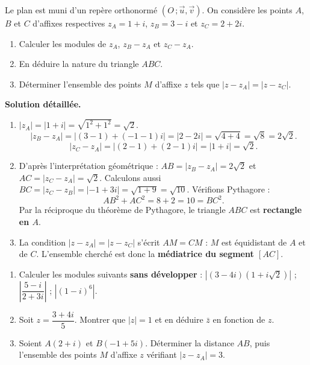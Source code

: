 \documentclass[11pt]{article}
\begin{document}
\begin{exoresolu}
Le plan est muni d'un repère orthonormé $(O\,;\vec{u},\vec{v})$. On considère les points $A$, $B$ et $C$ d'affixes respectives $z_A = 1 + i$, $z_B = 3 - i$ et $z_C = 2 + 2i$.
\begin{enumerate}
\item Calculer les modules de $z_A$, $z_B - z_A$ et $z_C - z_A$.
\item En déduire la nature du triangle $ABC$.
\item Déterminer l'ensemble des points $M$ d'affixe $z$ tels que $|z - z_A| = |z - z_C|$.
\end{enumerate}
\tcblower
\textbf{Solution détaillée.}
\begin{enumerate}
\item $|z_A| = |1+i| = \sqrt{1^2+1^2} = \sqrt{2}$.
\[ |z_B - z_A| = |(3-1) + (-1-1)i| = |2 - 2i| = \sqrt{4+4} = \sqrt{8} = 2\sqrt{2}. \]
\[ |z_C - z_A| = |(2-1) + (2-1)i| = |1 + i| = \sqrt{2}. \]
\item D'après l'interprétation géométrique : $AB = |z_B - z_A| = 2\sqrt{2}$ et $AC = |z_C - z_A| = \sqrt{2}$. Calculons aussi $BC = |z_C - z_B| = |-1 + 3i| = \sqrt{1+9} = \sqrt{10}$. Vérifions Pythagore :
\[ AB^2 + AC^2 = 8 + 2 = 10 = BC^2. \]
Par la réciproque du théorème de Pythagore, le triangle $ABC$ est \textbf{rectangle en $A$}.
\item La condition $|z - z_A| = |z - z_C|$ s'écrit $AM = CM$ : $M$ est équidistant de $A$ et de $C$. L'ensemble cherché est donc la \textbf{médiatrice du segment $[AC]$}.
\end{enumerate}
\end{exoresolu}

\begin{exercice}
\begin{enumerate}
\item Calculer les modules suivants \textbf{sans développer} : $\left|(3-4i)(1+i\sqrt{2})\right|$ ; $\left|\dfrac{5-i}{2+3i}\right|$ ; $\left|(1-i)^6\right|$.
\item Soit $z = \dfrac{3+4i}{5}$. Montrer que $|z| = 1$ et en déduire $\bar{z}$ en fonction de $z$.
\item Soient $A(2 + i)$ et $B(-1 + 5i)$. Déterminer la distance $AB$, puis l'ensemble des points $M$ d'affixe $z$ vérifiant $|z - z_A| = 3$.
\end{enumerate}
\end{exercice}
\end{document}
